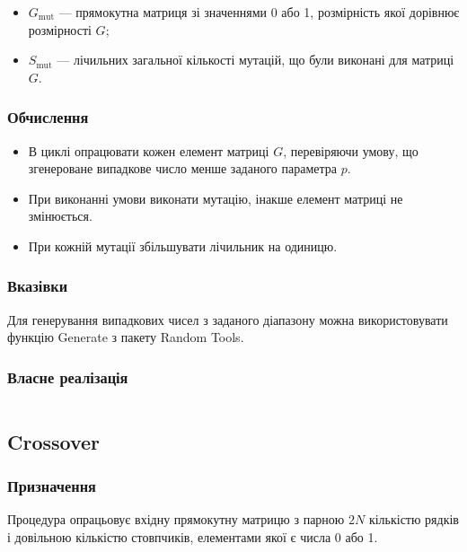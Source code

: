 \documentclass[a4paper, 12pt]{article}
\numberwithin{equation}{section}
\begin{document}
\begin{itemize}
    \item $G_{\text{mut}}$ --- прямокутна матриця зі значеннями 0 або 1, розмірність якої дорівнює розмірності $G$;
    \item $S_{\text{mut}}$ --- лічильних загальної кількості мутацій, що були виконані для матриці $G$.
\end{itemize}

\subsubsection*{Обчислення}

\begin{itemize}
    \item В циклі опрацювати кожен елемент матриці $G$, перевіряючи умову, що згенероване випадкове число менше заданого параметра $p$. 
    \item При виконанні умови виконати мутацію, інакше елемент матриці не змінюється. 
    \item При кожній мутації збільшувати лічильник на одиницю.
\end{itemize}

\subsubsection*{Вказівки}

Для генерування випадкових чисел з заданого діапазону можна використовувати функцію Generate з пакету Random Tools.

\subsubsection*{Власне реалізація}

\inputminted[firstline=6, lastline=15]{python}{../code/mutation.py}

\subsection{Crossover}

\subsubsection*{Призначення}

Процедура опрацьовує вхідну прямокутну матрицю з парною $2N$ кількістю рядків і довільною кількістю стовпчиків, елементами якої є числа 0 або 1. \medskip
\end{document}
